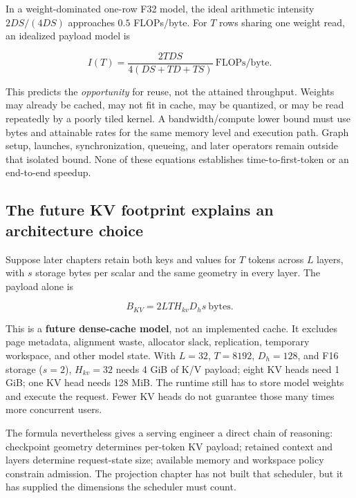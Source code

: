 In a weight-dominated one-row F32 model, the ideal arithmetic intensity
\(2DS/(4DS)\) approaches \(0.5\) FLOPs/byte. For \(T\) rows sharing one
weight read, an idealized payload model is

\begin{equation}
I(T)=\frac{2TDS}{4(DS+TD+TS)}\ \text{FLOPs/byte}.
\end{equation}

This predicts the \emph{opportunity} for reuse, not the attained
throughput. Weights may already be cached, may not fit in cache, may be
quantized, or may be read repeatedly by a poorly tiled kernel. A
bandwidth/compute lower bound must use bytes and attainable rates for
the same memory level and execution path. Graph setup, launches,
synchronization, queueing, and later operators remain outside that
isolated bound. None of these equations establishes time-to-first-token
or an end-to-end speedup.

\subsection{The future KV footprint explains an architecture
choice}\label{the-future-kv-footprint-explains-an-architecture-choice}

Suppose later chapters retain both keys and values for \(T\) tokens
across \(L\) layers, with \(s\) storage bytes per scalar and the same
geometry in every layer. The payload alone is

\begin{equation}
B_{KV}=2LTH_{kv}D_hs\ \text{bytes}.
\end{equation}

This is a \textbf{future dense-cache model}, not an implemented cache.
It excludes page metadata, alignment waste, allocator slack,
replication, temporary workspace, and other model state. With \(L=32\),
\(T=8192\), \(D_h=128\), and F16 storage (\(s=2\)), \(H_{kv}=32\) needs
4 GiB of K/V payload; eight KV heads need 1 GiB; one KV head needs 128
MiB. The runtime still has to store model weights and execute the
request. Fewer KV heads do not guarantee those many times more
concurrent users.

The formula nevertheless gives a serving engineer a direct chain of
reasoning: checkpoint geometry determines per-token KV payload; retained
context and layers determine request-state size; available memory and
workspace policy constrain admission. The projection chapter has not
built that scheduler, but it has supplied the dimensions the scheduler
must count.

